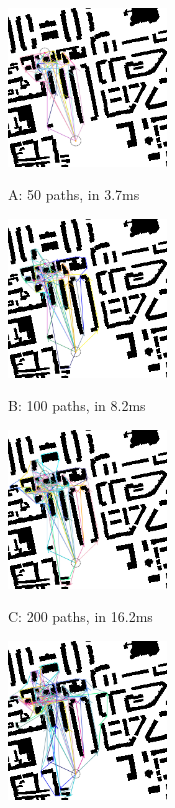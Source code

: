 \documentclass[lettersize,journal]{IEEEtran}
\begin{document}
\begin{figure}[t] \scriptsize
\begin{minipage}{.48\linewidth}
  \centerline{\includegraphics[width=4.2cm, cframe=gray .2mm]{50_RJ.png}}
  \centerline{A: 50 paths, in 3.7ms}
\end{minipage}
\hfill
\begin{minipage}{.48\linewidth}
  \centerline{\includegraphics[width=4.2cm, cframe=gray 0.1mm]{100_RJ.png}}
  \centerline{B: 100 paths, in 8.2ms}
\end{minipage}
\vfill
\begin{minipage}{.48\linewidth}
  \centerline{\includegraphics[width=4.2cm, cframe=gray 0.1mm]{200_RJ.png}}
  \centerline{C: 200 paths, in 16.2ms}
\end{minipage}
\hfill
\begin{minipage}{.48\linewidth}
  \centerline{\includegraphics[width=4.2cm, cframe=gray 0.1mm]{400_RJ.png}}

\end{minipage}
\end{figure}
\end{document}
